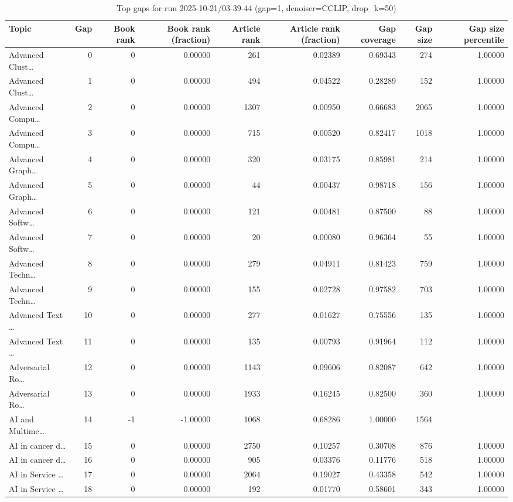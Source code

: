 \begin{table}
\caption{Top gaps for run 2025-10-21/03-39-44 (gap=1, denoiser=CCLIP, drop\_k=50)}
\label{tab:best_run_gap1_2025_10_21_03_39_44}
\begin{tabular}{lrrrrrrrr}
\toprule
Topic & Gap & Book rank & Book rank (fraction) & Article rank & Article rank (fraction) & Gap coverage & Gap size & Gap size percentile \\
\midrule
Advanced Clust… & 0 & 0 & 0.00000 & 261 & 0.02389 & 0.69343 & 274 & 1.00000 \\
Advanced Clust… & 1 & 0 & 0.00000 & 494 & 0.04522 & 0.28289 & 152 & 1.00000 \\
Advanced Compu… & 2 & 0 & 0.00000 & 1307 & 0.00950 & 0.66683 & 2065 & 1.00000 \\
Advanced Compu… & 3 & 0 & 0.00000 & 715 & 0.00520 & 0.82417 & 1018 & 1.00000 \\
Advanced Graph… & 4 & 0 & 0.00000 & 320 & 0.03175 & 0.85981 & 214 & 1.00000 \\
Advanced Graph… & 5 & 0 & 0.00000 & 44 & 0.00437 & 0.98718 & 156 & 1.00000 \\
Advanced Softw… & 6 & 0 & 0.00000 & 121 & 0.00481 & 0.87500 & 88 & 1.00000 \\
Advanced Softw… & 7 & 0 & 0.00000 & 20 & 0.00080 & 0.96364 & 55 & 1.00000 \\
Advanced Techn… & 8 & 0 & 0.00000 & 279 & 0.04911 & 0.81423 & 759 & 1.00000 \\
Advanced Techn… & 9 & 0 & 0.00000 & 155 & 0.02728 & 0.97582 & 703 & 1.00000 \\
Advanced Text … & 10 & 0 & 0.00000 & 277 & 0.01627 & 0.75556 & 135 & 1.00000 \\
Advanced Text … & 11 & 0 & 0.00000 & 135 & 0.00793 & 0.91964 & 112 & 1.00000 \\
Adversarial Ro… & 12 & 0 & 0.00000 & 1143 & 0.09606 & 0.82087 & 642 & 1.00000 \\
Adversarial Ro… & 13 & 0 & 0.00000 & 1933 & 0.16245 & 0.82500 & 360 & 1.00000 \\
AI and Multime… & 14 & -1 & -1.00000 & 1068 & 0.68286 & 1.00000 & 1564 &  \\
AI in cancer d… & 15 & 0 & 0.00000 & 2750 & 0.10257 & 0.30708 & 876 & 1.00000 \\
AI in cancer d… & 16 & 0 & 0.00000 & 905 & 0.03376 & 0.11776 & 518 & 1.00000 \\
AI in Service … & 17 & 0 & 0.00000 & 2064 & 0.19027 & 0.43358 & 542 & 1.00000 \\
AI in Service … & 18 & 0 & 0.00000 & 192 & 0.01770 & 0.58601 & 343 & 1.00000 \\

\end{tabular}
\end{table}
